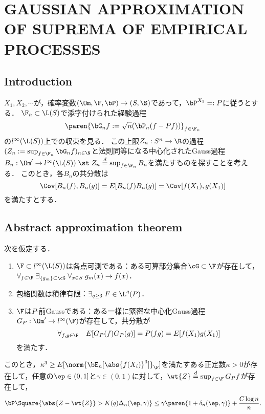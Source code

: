 \documentclass[uplatex,dvipdfmx]{jsreport}
\begin{document}
\section{GAUSSIAN APPROXIMATION OF SUPREMA OF EMPIRICAL PROCESSES}

\subsection{Introduction}

\begin{notation}
    $X_1,X_2,\cdots$が，確率変数$(\Om,\F,\bP)\to(S,\S)$であって，$\bP^{X_1}=:P$に従うとする．
    $\F_n\subset\L(S)$で添字付けられた経験過程
    \[\paren{\bG_nf:=\sqrt{n}(\bP_n(f-Pf))}_{f\in\F_n}\]
    の$l^\infty(\L(S))$上での収束を見る．
    この上限$Z_n:S^n\to\R$の過程$(Z_n:=\sup_{f\in\F_n}\bG_nf)_{n\in\N}$と法則同等になる中心化されたGauss過程$B_n:\Om'\to l^\infty(\L(S))\;\st\;Z_n\overset{d}{=}\sup_{f\in\F_n}B_n$を満たすものを探すことを考える．
    このとき，各$B_n$の共分散は
    \[\Cov[B_n(f),B_n(g)]=E[B_n(f)B_n(g)]=\Cov[f(X_1),g(X_1)]\]
    を満たすとする．
\end{notation}

\subsection{Abstract approximation theorem}

\begin{theorem}
    次を仮定する．
    \begin{enumerate}[({A}1)]
        \item $\F\subset l^\infty(\L(S))$は各点可測である：ある可算部分集合$\cG\subset\F$が存在して，$\forall_{f\in\F}\;\exists_{\{g_m\}\subset\cG}\;\forall_{x\in S}\;g_m(x)\to f(x)$．
        \item 包絡関数は積律有限：$\exists_{q\ge 3}\;F\in\L^q(P)$．
        \item $\F$は$P$-前Gaussである：ある一様に緊密な中心化Gauss過程$G_P:\Om'\to l^\infty(\F)$が存在して，共分散が
        \[\forall_{f,g\in\F}\quad E[G_P(f)G_P(g)]=P(fg)=E[f(X_1)g(X_1)]\]
        を満たす．
    \end{enumerate}
    このとき，$\kappa^3\ge E[\norm{\bE_n[\abs{f(X_i)}^3]}_\F]$を満たすある正定数$\kappa>0$が存在して，任意の$\ep\in(0,1]$と$\gamma\in(0,1)$に対して，$\wt{Z}\overset{d}{=}\sup_{f\in\F}G_Pf$が存在して，
    \[\bP\Square{\abs{Z-\wt{Z}}>K(q)\Delta_n(\ep,\gamma)}\le\gamma\paren{1+\delta_n(\ep,\gamma)}+\frac{C\log n}{n}.\]
\end{theorem}
\end{document}

